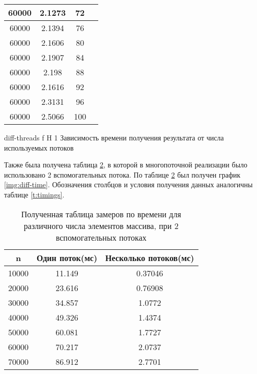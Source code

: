 \begin{table}[H]
\begin{tabular}{|c|c|c|c|}
		60000 & 2.1273                            & 72            \\ \hline
		60000 & 2.1394                            & 76            \\ \hline
		60000 & 2.1606                            & 80            \\ \hline
		60000 & 2.1907                            & 84            \\ \hline
		60000 & 2.198                             & 88            \\ \hline
		60000 & 2.1616                            & 92            \\ \hline
		60000 & 2.3131                            & 96            \\ \hline
		60000 & 2.5066                            & 100           \\ \hline
	\end{tabular}
	\label{t:timings-threads}
\end{table}


{diff-threads} %
{f} %
{H} %
{1\textwidth} %
{Зависимость времени получения результата от числа используемых потоков} %


Также была получена таблица \ref{t:timings-n}, в которой в многопоточной реализации было использовано 2 вспомогательных потока. По таблице \ref{t:timings-n} был получен график \ref{img:diff-time}. 
Обозначения столбцов и условия получения данных аналогичны таблице \ref{t:timings}.
\begin{table}[H]
	\centering
	\caption{Полученная таблица замеров по времени для различного числа элементов массива, при 2 вспомогательных потоках}
	\begin{tabular}{|c|c|c|}
		\hline
		n     & Один поток(мс) & Несколько потоков(мс) \\ \hline
		10000 & 11.149                  & 0.37046                           \\ \hline
		20000 & 23.616                  & 0.76908                           \\ \hline
		30000 & 34.857                  & 1.0772                            \\ \hline
		40000 & 49.326                  & 1.4374                            \\ \hline
		50000 & 60.081                  & 1.7727                            \\ \hline
		60000 & 70.217                  & 2.0737                            \\ \hline
		70000 & 86.912                  & 2.7701                            \\ \hline
	\end{tabular}
	\label{t:timings-n}
\end{table}


